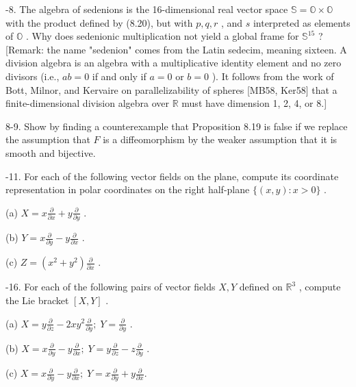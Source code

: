 \begin{exercise}
\label{prob:8-8}
-8. The algebra of sedenions is the 16-dimensional real vector space $\mathbb{S} = \mathbb{O} \times  \mathbb{O}$ with the product defined by (8.20), but with $p, q, r$ , and $s$ interpreted as elements of $\mathbb{O}$ . Why does sedenionic multiplication not yield a global frame for ${\mathbb{S}}^{15}$ ? [Remark: the name "sedenion" comes from the Latin sedecim, meaning sixteen. A division algebra is an algebra with a multiplicative identity element and no zero divisors (i.e., ${ab} = 0$ if and only if $a = 0$ or $b = 0$ ). It follows from the work of Bott, Milnor, and Kervaire on parallelizability of spheres [MB58, Ker58] that a finite-dimensional division algebra over $\mathbb{R}$ must have dimension 1, 2, 4, or 8.]
\end{exercise}

\begin{exercise}
\label{prob:8-9}
\leanok
{}
8-9. Show by finding a counterexample that Proposition 8.19 is false if we replace the assumption that $F$ is a diffeomorphism by the weaker assumption that it is smooth and bijective.
\end{exercise}

\begin{exercise}
\label{prob:8-11}
-11. For each of the following vector fields on the plane, compute its coordinate representation in polar coordinates on the right half-plane $\{ \left( {x, y}\right)  : x > 0\}$ .

(a) $X = x\frac{\partial }{\partial x} + y\frac{\partial }{\partial y}$ .

(b) $Y = x\frac{\partial }{\partial y} - y\frac{\partial }{\partial x}$ .

(c) $Z = \left( {{x}^{2} + {y}^{2}}\right) \frac{\partial }{\partial x}$ .
\end{exercise}

\begin{exercise}
\label{prob:8-16}
-16. For each of the following pairs of vector fields $X, Y$ defined on ${\mathbb{R}}^{3}$ , compute the Lie bracket $\left\lbrack  {X, Y}\right\rbrack$ .

(a) $X = y\frac{\partial }{\partial z} - {2x}{y}^{2}\frac{\partial }{\partial y};\;Y = \frac{\partial }{\partial y}$ .

(b) $X = x\frac{\partial }{\partial y} - y\frac{\partial }{\partial x};\;Y = y\frac{\partial }{\partial z} - z\frac{\partial }{\partial y}$ .

(c) $X = x\frac{\partial }{\partial y} - y\frac{\partial }{\partial x};\;Y = x\frac{\partial }{\partial y} + y\frac{\partial }{\partial x}.$
\end{exercise}

